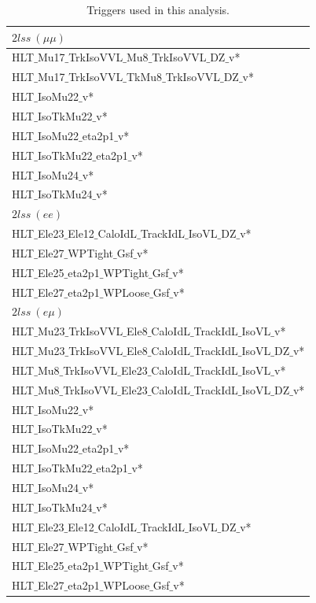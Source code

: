 \begin{longtable}{l}
\caption[TRIGGER LIST]{Triggers used in this analysis.\label{tab:triggers}}\\
\hline
$2lss~(\mu\mu)$ \\
\hline
HLT$\_$Mu17$\_$TrkIsoVVL$\_$Mu8$\_$TrkIsoVVL$\_$DZ$\_$v* \\
HLT$\_$Mu17$\_$TrkIsoVVL$\_$TkMu8$\_$TrkIsoVVL$\_$DZ$\_$v* \\
HLT$\_$IsoMu22$\_$v* \\
HLT$\_$IsoTkMu22$\_$v* \\
HLT$\_$IsoMu22$\_$eta2p1$\_$v* \\
HLT$\_$IsoTkMu22$\_$eta2p1$\_$v* \\
HLT$\_$IsoMu24$\_$v* \\
HLT$\_$IsoTkMu24$\_$v* \\
\hline
\hline
$2lss~(ee)$ \\
\hline
HLT$\_$Ele23$\_$Ele12$\_$CaloIdL$\_$TrackIdL$\_$IsoVL$\_$DZ$\_$v* \\
HLT$\_$Ele27$\_$WPTight$\_$Gsf$\_$v* \\
HLT$\_$Ele25$\_$eta2p1$\_$WPTight$\_$Gsf$\_$v* \\
HLT$\_$Ele27$\_$eta2p1$\_$WPLoose$\_$Gsf$\_$v* \\
\hline
\hline
$2lss~(e\mu)$ \\
\hline
HLT$\_$Mu23$\_$TrkIsoVVL$\_$Ele8$\_$CaloIdL$\_$TrackIdL$\_$IsoVL$\_$v* \\
HLT$\_$Mu23$\_$TrkIsoVVL$\_$Ele8$\_$CaloIdL$\_$TrackIdL$\_$IsoVL$\_$DZ$\_$v* \\
HLT$\_$Mu8$\_$TrkIsoVVL$\_$Ele23$\_$CaloIdL$\_$TrackIdL$\_$IsoVL$\_$v* \\
HLT$\_$Mu8$\_$TrkIsoVVL$\_$Ele23$\_$CaloIdL$\_$TrackIdL$\_$IsoVL$\_$DZ$\_$v* \\
HLT$\_$IsoMu22$\_$v* \\
HLT$\_$IsoTkMu22$\_$v* \\
HLT$\_$IsoMu22$\_$eta2p1$\_$v* \\
HLT$\_$IsoTkMu22$\_$eta2p1$\_$v* \\
HLT$\_$IsoMu24$\_$v* \\
HLT$\_$IsoTkMu24$\_$v* \\
HLT$\_$Ele23$\_$Ele12$\_$CaloIdL$\_$TrackIdL$\_$IsoVL$\_$DZ$\_$v* \\
HLT$\_$Ele27$\_$WPTight$\_$Gsf$\_$v* \\
HLT$\_$Ele25$\_$eta2p1$\_$WPTight$\_$Gsf$\_$v* \\
HLT$\_$Ele27$\_$eta2p1$\_$WPLoose$\_$Gsf$\_$v* \\
\hline
\end{longtable}

